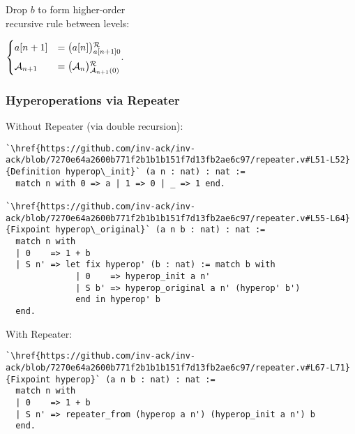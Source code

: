 \begin{frame}[fragile]
\smallskip

\pause 
\begin{minipage}{0.4\linewidth}
	Drop $b$ to form higher-order \\ recursive rule between levels:
\end{minipage}
\quad 
$\begin{cases}
\displaystyle a[n+1] & = \rf{\big(a[n]\big)}{a[n+1]0} \\[5pt]
\Ack_{n+1} & = \rf{\big(\Ack_n\big)}{\Ack_{n+1}(0)}
\end{cases}$.

\end{frame}


\begin{frame}[fragile]
\frametitle{Hyperoperations via Repeater}
Without Repeater (via double recursion):
\begin{lstlisting}
`\href{https://github.com/inv-ack/inv-ack/blob/7270e64a2600b771f2b1b1b151f7d13fb2ae6c97/repeater.v#L51-L52}{Definition hyperop\_init}` (a n : nat) : nat :=
  match n with 0 => a | 1 => 0 | _ => 1 end.

`\href{https://github.com/inv-ack/inv-ack/blob/7270e64a2600b771f2b1b1b151f7d13fb2ae6c97/repeater.v#L55-L64}{Fixpoint hyperop\_original}` (a n b : nat) : nat :=
  match n with
  | 0    => 1 + b
  | S n' => let fix hyperop' (b : nat) := match b with
              | 0    => hyperop_init a n'
              | S b' => hyperop_original a n' (hyperop' b')
              end in hyperop' b
  end.
\end{lstlisting}

\pause 
With Repeater:
\begin{lstlisting} 
`\href{https://github.com/inv-ack/inv-ack/blob/7270e64a2600b771f2b1b1b151f7d13fb2ae6c97/repeater.v#L67-L71}{Fixpoint hyperop}` (a n b : nat) : nat :=
  match n with
  | 0    => 1 + b
  | S n' => repeater_from (hyperop a n') (hyperop_init a n') b
  end.
\end{lstlisting}
\end{frame}


